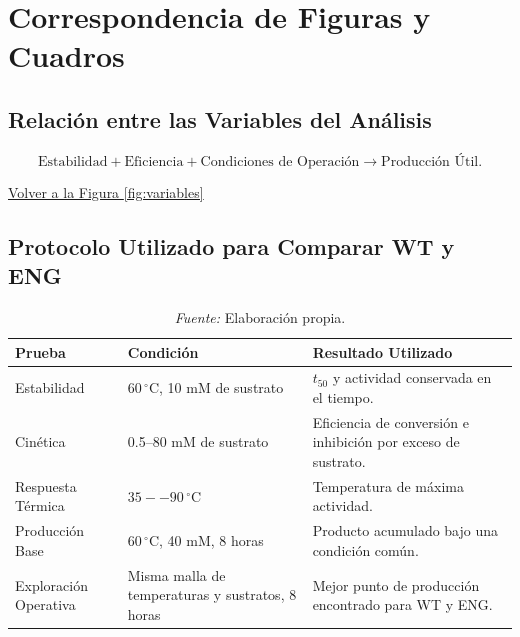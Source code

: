 \appendix

\renewcommand{\thefigure}{\thesection.\arabic{figure}}
\renewcommand{\thetable}{\thesection.\arabic{table}}
\renewcommand{\theequation}{\thesection.\arabic{equation}}

\section{Correspondencia de Figuras y Cuadros}
\label{sec:anexos}

\subsection{Relación entre las Variables del Análisis}
\label{anx:fig_variables}

\begin{equation}
\text{Estabilidad}
+
\text{Eficiencia}
+
\text{Condiciones de Operación}
\longrightarrow
\text{Producción Útil}.
\end{equation}

\begin{center}
\small\hyperref[fig:variables]{Volver a la Figura \ref*{fig:variables}}
\end{center}


\subsection{Protocolo Utilizado para Comparar WT y ENG}
\label{anx:tab_protocolo}

\begin{table}[H]
\centering
\caption{Protocolo Utilizado para Comparar WT y ENG}
\caption*{\small\textit{Fuente:} Elaboración propia.}
\renewcommand{\arraystretch}{1.25}
\begin{tabularx}{0.96\textwidth}{|p{2.6cm}|p{4.1cm}|X|}
\hline
Prueba & Condición & Resultado Utilizado \\ \hline
Estabilidad & \(60\,^{\circ}\mathrm{C}\), 10 mM de sustrato &
\(t_{50}\) y actividad conservada en el tiempo. \\ \hline
Cinética & 0.5--80 mM de sustrato &
Eficiencia de conversión e inhibición por exceso de sustrato. \\ \hline
Respuesta Térmica & \(35--90\,^{\circ}\mathrm{C}\) &
Temperatura de máxima actividad. \\ \hline
Producción Base & \(60\,^{\circ}\mathrm{C}\), 40 mM, 8 horas &
Producto acumulado bajo una condición común. \\ \hline
Exploración Operativa & Misma malla de temperaturas y sustratos, 8 horas &
Mejor punto de producción encontrado para WT y ENG. \\ \hline
\end{tabularx}
\end{table}

